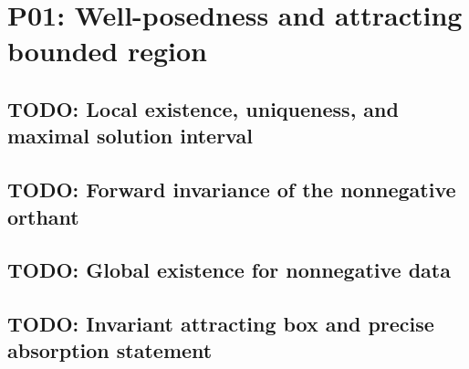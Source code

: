 
\section{P01: Well-posedness and attracting bounded region}
\label{sec:P01}

\subsection{TODO: Local existence, uniqueness, and maximal solution interval}
\label{slot:P01-1}

\subsection{TODO: Forward invariance of the nonnegative orthant}
\label{slot:P01-2}

\subsection{TODO: Global existence for nonnegative data}
\label{slot:P01-3}

\subsection{TODO: Invariant attracting box and precise absorption statement}
\label{slot:P01-4}
